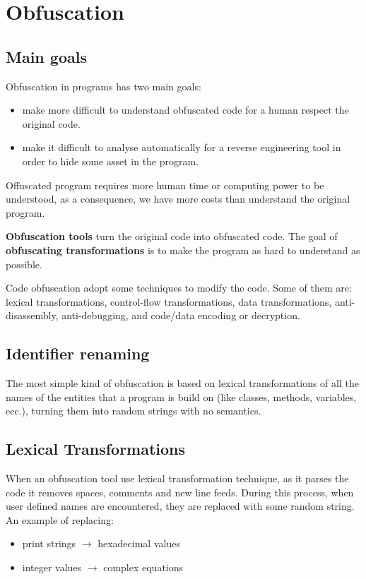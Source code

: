 \section{Obfuscation}

\subsection{Main goals}
Obfuscation in programs has two main goals: 
\begin{itemize}
    \item make more difficult to understand obfuscated code for a human respect the original  code.
    \item make it difficult to analyse automatically for a reverse engineering tool in order to hide some asset in the program. 
\end{itemize}

Offuscated program requires more human time or computing power to be understood, as a consequence, we have more costs than understand the original program. 

\textbf{Obfuscation tools} turn the original code into obfuscated code.
The goal of \textbf{obfuscating transformations} is to make the program as hard to understand as possible. 

Code obfuscation adopt some techniques to modify the code. Some of them are: lexical transformations, control-flow transformations, data transformations, anti-disassembly, anti-debugging, and code/data encoding or decryption.

\subsection{Identifier renaming}

The most simple kind of obfuscation is based on lexical transformations of all the names of the entities that a program is build on (like classes, methods, variables, ecc.), turning them into random strings with no semantics.  

\subsection{Lexical Transformations}

When an obfuscation tool use lexical transformation technique, as it parses the code it removes spaces, comments and new line feeds. 
During this process, when user defined names are encountered, they are replaced with some random string.
An example of replacing: 
\begin{itemize}
    \item print strings $\rightarrow$ hexadecimal values
    \item integer values $\rightarrow$ complex equations 
\end{itemize}

